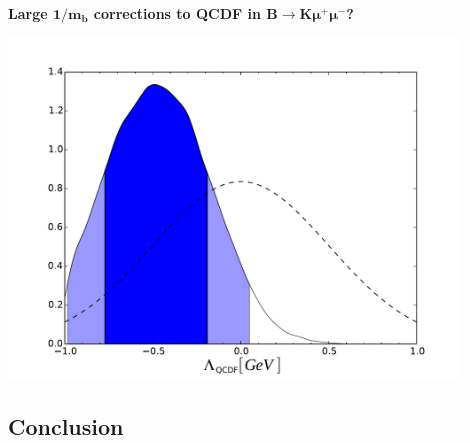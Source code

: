 \documentclass[english]{beamer}
\newcommand{\slide}[2][t]{\begin{frame}[#1] \frametitle{\insertsubsectionhead} #2 \end{frame}}
\begin{document}
\slide{

    {\large\textbf{Large $\boldsymbol{1/m_b}$ corrections to QCDF in $\boldsymbol{B \rightarrow K \mu^+ \mu^-}$?}}

    \begin{center}
        \includegraphics[width=0.9\textwidth]{figures/SL_large_recoil}
    \end{center}

}

\subsection{Conclusion}
\end{document}
